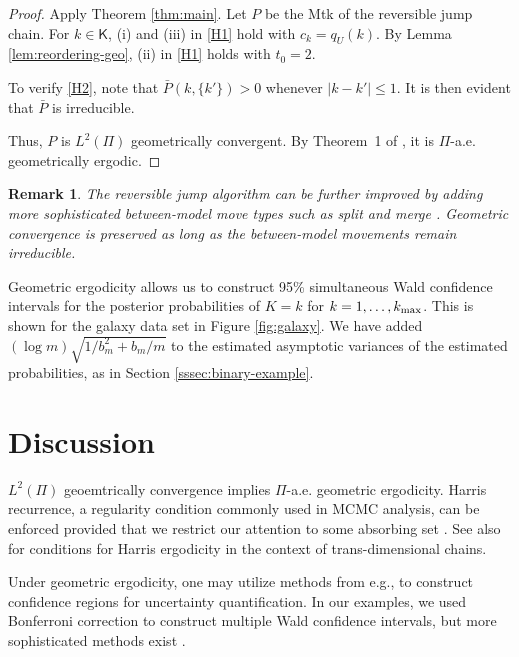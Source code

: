 \documentclass[12pt]{article}
\newcommand{\pcite}[1]{\citeauthor{#1}'s \citeyearpar{#1}}
\newtheorem{remark}[theorem]{Remark}
\begin{document}
\begin{proof}
	Apply Theorem \ref{thm:main}.
	Let $P$ be the Mtk of the reversible jump chain.
	For $k \in \mathsf{K}$, (i) and (iii) in \ref{H1} hold with $c_k = q_U(k)$.
	By Lemma \ref{lem:reordering-geo}, (ii) in \ref{H1} holds with $t_0 = 2$.
	
	To verify \ref{H2}, note that $\bar{P}(k,\{k'\}) > 0$ whenever $|k-k'| \leq 1$.
	It is then evident that $\bar{P}$ is irreducible.
	
	Thus, $P$ is $L^2(\Pi)$ geometrically convergent.
	By Theorem~1 of \cite{roberts2001geometric}, it is $\Pi$-a.e. geometrically ergodic.
\end{proof}

\begin{remark}
	The reversible jump algorithm can be further improved by adding more sophisticated between-model move types such as split and merge \citep{richardson1997bayesian,zhang2004learning}.
	Geometric convergence is preserved as long as the between-model movements remain irreducible.
\end{remark}

Geometric ergodicity allows us to construct 95\% simultaneous Wald confidence intervals for the posterior probabilities of $K = k$ for $k = 1,\dots, k_{\scriptsize\mbox{max}}$.
This is shown for the galaxy data set in Figure \ref{fig:galaxy}.
We have added $(\log m) \sqrt{1/b_m^2+b_m/m}$ to the estimated asymptotic variances of the estimated probabilities, as in Section \ref{sssec:binary-example}.

{\section{Discussion} \label{sec:discussion} }

$L^2(\Pi)$ geoemtrically convergence implies $\Pi$-a.e. geometric ergodicity.
Harris recurrence, a regularity condition commonly used in MCMC analysis, can be enforced provided that we restrict our attention to some absorbing set \citep[][Theorem 9.0.1]{meyn2012markov}.
See also \cite{roberts2006harris} for conditions for Harris ergodicity in the context of trans-dimensional chains.

Under geometric ergodicity, one may utilize methods from e.g., \cite{jones2006fixed,vats2019multivariate} to construct confidence regions for uncertainty quantification.
In our examples, we used Bonferroni correction to construct multiple Wald confidence intervals, but more sophisticated methods exist \citep{vats2019multivariate,robertson2020assessing}.
\end{document}

